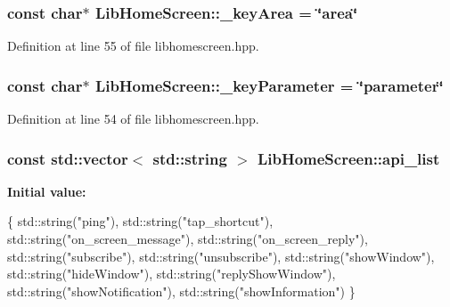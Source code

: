 \subsubsection[{\texorpdfstring{\+\_\+key\+Area}{_keyArea}}]{\setlength{\rightskip}{0pt plus 5cm}const char$\ast$ Lib\+Home\+Screen\+::\+\_\+key\+Area = \char`\"{}area\char`\"{}}\hypertarget{class_lib_home_screen_a8becda1b035ae45f5a11c7e7963091bf}{}\label{class_lib_home_screen_a8becda1b035ae45f5a11c7e7963091bf}


Definition at line 55 of file libhomescreen.\+hpp.

\subsubsection[{\texorpdfstring{\+\_\+key\+Parameter}{_keyParameter}}]{\setlength{\rightskip}{0pt plus 5cm}const char$\ast$ Lib\+Home\+Screen\+::\+\_\+key\+Parameter = \char`\"{}parameter\char`\"{}}\hypertarget{class_lib_home_screen_a927592eff8e34efbbceaf12522f8897f}{}\label{class_lib_home_screen_a927592eff8e34efbbceaf12522f8897f}


Definition at line 54 of file libhomescreen.\+hpp.

\subsubsection[{\texorpdfstring{api\+\_\+list}{api_list}}]{\setlength{\rightskip}{0pt plus 5cm}const std\+::vector$<$ std\+::string $>$ Lib\+Home\+Screen\+::api\+\_\+list\hspace{0.3cm}{\ttfamily [static]}}\hypertarget{class_lib_home_screen_a5593ff5ac78f6495ccb649904cf0ab08}{}\label{class_lib_home_screen_a5593ff5ac78f6495ccb649904cf0ab08}
{\bfseries Initial value\+:}
\begin{DoxyCode}
\{
    std::string(\textcolor{stringliteral}{"ping"}), 
    std::string(\textcolor{stringliteral}{"tap\_shortcut"}), 
    std::string(\textcolor{stringliteral}{"on\_screen\_message"}),
    std::string(\textcolor{stringliteral}{"on\_screen\_reply"}),
    std::string(\textcolor{stringliteral}{"subscribe"}),
    std::string(\textcolor{stringliteral}{"unsubscribe"}),
    std::string(\textcolor{stringliteral}{"showWindow"}),
    std::string(\textcolor{stringliteral}{"hideWindow"}),
    std::string(\textcolor{stringliteral}{"replyShowWindow"}),
    std::string(\textcolor{stringliteral}{"showNotification"}),
    std::string(\textcolor{stringliteral}{"showInformation"})
\}
\end{DoxyCode}


